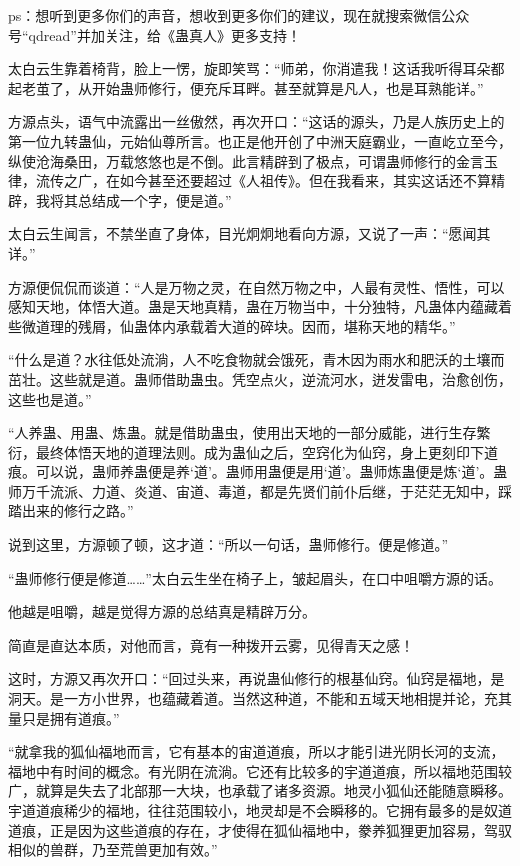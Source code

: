 
\begin{this_body}

ps：想听到更多你们的声音，想收到更多你们的建议，现在就搜索微信公众号“qdread”并加关注，给《蛊真人》更多支持！

太白云生靠着椅背，脸上一愣，旋即笑骂：“师弟，你消遣我！这话我听得耳朵都起老茧了，从开始蛊师修行，便充斥耳畔。甚至就算是凡人，也是耳熟能详。”

方源点头，语气中流露出一丝傲然，再次开口：“这话的源头，乃是人族历史上的第一位九转蛊仙，元始仙尊所言。也正是他开创了中洲天庭霸业，一直屹立至今，纵使沧海桑田，万载悠悠也是不倒。此言精辟到了极点，可谓蛊师修行的金言玉律，流传之广，在如今甚至还要超过《人祖传》。但在我看来，其实这话还不算精辟，我将其总结成一个字，便是道。”

太白云生闻言，不禁坐直了身体，目光炯炯地看向方源，又说了一声：“愿闻其详。”

方源便侃侃而谈道：“人是万物之灵，在自然万物之中，人最有灵性、悟性，可以感知天地，体悟大道。蛊是天地真精，蛊在万物当中，十分独特，凡蛊体内蕴藏着些微道理的残屑，仙蛊体内承载着大道的碎块。因而，堪称天地的精华。”

“什么是道？水往低处流淌，人不吃食物就会饿死，青木因为雨水和肥沃的土壤而茁壮。这些就是道。蛊师借助蛊虫。凭空点火，逆流河水，迸发雷电，治愈创伤，这些也是道。”

“人养蛊、用蛊、炼蛊。就是借助蛊虫，使用出天地的一部分威能，进行生存繁衍，最终体悟天地的道理法则。成为蛊仙之后，空窍化为仙窍，身上更刻印下道痕。可以说，蛊师养蛊便是养‘道’。蛊师用蛊便是用‘道’。蛊师炼蛊便是炼‘道’。蛊师万千流派、力道、炎道、宙道、毒道，都是先贤们前仆后继，于茫茫无知中，踩踏出来的修行之路。”

说到这里，方源顿了顿，这才道：“所以一句话，蛊师修行。便是修道。”

“蛊师修行便是修道……”太白云生坐在椅子上，皱起眉头，在口中咀嚼方源的话。

他越是咀嚼，越是觉得方源的总结真是精辟万分。

简直是直达本质，对他而言，竟有一种拨开云雾，见得青天之感！

这时，方源又再次开口：“回过头来，再说蛊仙修行的根基仙窍。仙窍是福地，是洞天。是一方小世界，也蕴藏着道。当然这种道，不能和五域天地相提并论，充其量只是拥有道痕。”

“就拿我的狐仙福地而言，它有基本的宙道道痕，所以才能引进光阴长河的支流，福地中有时间的概念。有光阴在流淌。它还有比较多的宇道道痕，所以福地范围较广，就算是失去了北部那一大块，也承载了诸多资源。地灵小狐仙还能随意瞬移。宇道道痕稀少的福地，往往范围较小，地灵却是不会瞬移的。它拥有最多的是奴道道痕，正是因为这些道痕的存在，才使得在狐仙福地中，豢养狐狸更加容易，驾驭相似的兽群，乃至荒兽更加有效。”


\end{this_body}
